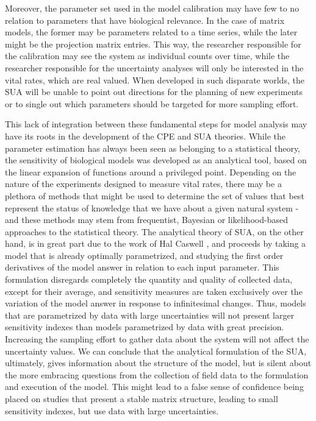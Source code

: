 \documentclass[twoside,12pt,a4paper]{article}
\begin{document}
Moreover, the parameter set used in the model calibration may have few to no relation to parameters that
have biological relevance. In the case of matrix models, the former may be parameters related to a time 
series, while the later might be the projection matrix entries. This way, the researcher responsible for
the calibration may see the system as individual counts over time, while the researcher responsible for 
the uncertainty analyses will only be interested in the vital rates, which are real valued. When developed
in such disparate worlds, the SUA will be unable to point out directions for the planning of new experiments
or to single out which parameters should be targeted for more sampling effort.

This lack of integration between these fundamental steps for model analysis may have its roots in the
development of the CPE and SUA theories. While the parameter estimation has always been seen as belonging
to a statistical theory, the sensitivity of biological models was developed as an analytical tool, based on
the linear expansion of functions around a privileged point. Depending on the nature of the experiments
designed to measure vital rates, there may be a plethora of methods that might be used to determine the
set of values that best represent the status of knowledge that we have about a given natural system - and
these methods may stem from frequentist, Bayesian or likelihood-based approaches to the statistical theory.
The analytical theory of SUA, on the other hand, is in great part due to the work of Hal 
Caswell \citep{Caswell89}, and proceeds by taking a model that is already optimally parametrized, and studying
the first order derivatives of the model answer in relation to each input parameter. This formulation 
disregards completely the quantity and quality of collected data, except for their average, and sensitivity
measures are taken exclusively over the variation of the model answer in response to infinitesimal changes.
Thus, models that are parametrized by data with large uncertainties will not present larger sensitivity 
indexes than models parametrized by data with great precision. Increasing the sampling effort to gather
data about the system will not affect the uncertainty values. We can conclude that the analytical formulation
of the SUA, ultimately, gives information about the structure of the model, but is silent about the more
embracing questions from the collection of field data to the formulation and execution of the model. This might
lead to a false sense of confidence being placed on studies that present a stable matrix structure, leading
to small sensitivity indexes, but use data with large uncertainties.
\end{document}
